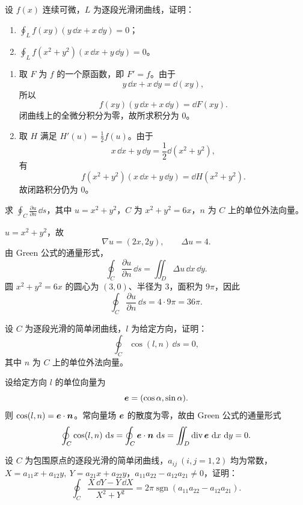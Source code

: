 \begin{xexercise}[2]
设 $f(x)$ 连续可微，$L$ 为逐段光滑闭曲线，证明：
\begin{enumerate}[label=(\arabic*)]
  \item $\displaystyle\oint_Lf(xy)(y\,\dd x+x\,\dd y)=0$；
  \item $\displaystyle\oint_Lf(x^2+y^2)(x\,\dd x+y\,\dd y)=0$。
\end{enumerate}
\end{xexercise}
\begin{xsolution}
\begin{enumerate}[label=(\arabic*)]
\item 取 $F$ 为 $f$ 的一个原函数，即 $F'=f$。由于
\[
  y\,\dd x+x\,\dd y=\dd(xy),
\]
所以
\[
  f(xy)(y\,\dd x+x\,\dd y)=\dd F(xy).
\]
闭曲线上的全微分积分为零，故所求积分为 $0$。

\item 取 $H$ 满足 $H'(u)=\frac12f(u)$。由于
\[
  x\,\dd x+y\,\dd y=\frac12\dd(x^2+y^2),
\]
有
\[
  f(x^2+y^2)(x\,\dd x+y\,\dd y)
  =\dd H(x^2+y^2).
\]
故闭路积分仍为 $0$。
\end{enumerate}
\end{xsolution}
\begin{xexercise}[3]
求 $\displaystyle\oint_C\frac{\partial u}{\partial n}\,\dd s$，其中 $u=x^2+y^2$，$C$ 为 $x^2+y^2=6x$，$n$ 为 $C$ 上的单位外法向量。
\end{xexercise}
\begin{xsolution}
$u=x^2+y^2$，故
\[
  \nabla u=(2x,2y),\qquad \Delta u=4.
\]
由 Green 公式的通量形式，
\[
  \oint_C\frac{\partial u}{\partial n}\,\dd s
  =\iint_D\Delta u\,\dd x\,\dd y.
\]
圆 $x^2+y^2=6x$ 的圆心为 $(3,0)$、半径为 $3$，面积为 $9\pi$，因此
\[
  \oint_C\frac{\partial u}{\partial n}\,\dd s
  =4\cdot9\pi=36\pi.
\]
\end{xsolution}
\begin{xexercise}[4]
设 $C$ 为逐段光滑的简单闭曲线，$l$ 为给定方向，证明：
\[
  \oint_C\cos(l,n)\,\dd s=0,
\]
其中 $n$ 为 $C$ 上的单位外法向量。
\end{xexercise}
\begin{xsolution}
设给定方向 $l$ 的单位向量为
\[
  \bm{e}=(\cos\alpha,\sin\alpha).
\]
则 $\cos(l,n)=\bm{e}\cdot\bm{n}$。常向量场 $\bm{e}$ 的散度为零，故由 Green 公式的通量形式
\[
  \oint_C\cos(l,n)\,\mathop{}\!\mathrm{d} s
  =\oint_C\bm{e}\cdot\bm{n}\,\mathop{}\!\mathrm{d} s
  =\iint_D\operatorname{div}\bm{e}\,\mathop{}\!\mathrm{d} x\,\mathop{}\!\mathrm{d} y=0.
\]
\end{xsolution}
\begin{xexercise}[5]
设 $C$ 为包围原点的逐段光滑的简单闭曲线，$a_{ij}\ (i,j=1,2)$ 均为常数，$X=a_{11}x+a_{12}y,\ Y=a_{21}x+a_{22}y$，$a_{11}a_{22}-a_{12}a_{21}\ne0$，证明：
\[
  \oint_C\frac{X\,\dd Y-Y\,\dd X}{X^2+Y^2}=2\pi\operatorname{sgn}(a_{11}a_{22}-a_{12}a_{21}).
\]
\end{xexercise}
